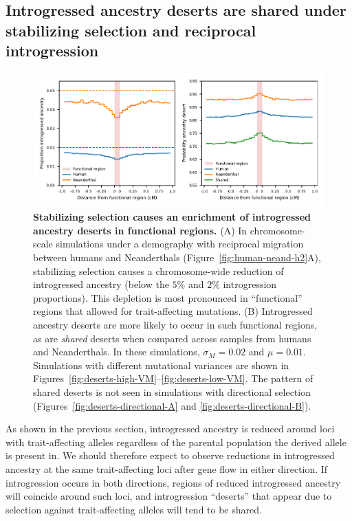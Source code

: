 \documentclass{article}
\begin{document}
\subsection*{Introgressed ancestry deserts are shared under stabilizing
selection and reciprocal introgression}

\begin{figure}[ht!]
    \centering
    \includegraphics{../figures/introgression_deserts.SD_0.02.pdf}
    \caption{
        \textbf{Stabilizing selection causes an enrichment of introgressed
        ancestry deserts in functional regions.} (A) In chromosome-scale
        simulations under a demography with reciprocal migration between humans
        and Neanderthals (Figure~\ref{fig:human-neand-h2}A), stabilizing
        selection causes a chromosome-wide reduction of introgressed ancestry
        (below the $5\%$ and $2\%$ introgression proportions). This depletion
        is most pronounced in ``functional'' regions that allowed for
        trait-affecting mutations. (B) Introgressed ancestry deserts are
        more likely to occur in such functional regions, as are
        \emph{shared} deserts when compared across samples from humans and
        Neanderthals. In these simulations, $\sigma_M=0.02$ and $\mu=0.01$.
        Simulations with different mutational variances are shown in
        Figures~\ref{fig:deserts-high-VM}--\ref{fig:deserts-low-VM}.
        The pattern of shared deserts is not seen in simulations with
        directional selection (Figures~\ref{fig:deserts-directional-A}
        and \ref{fig:deserts-directional-B}).
    }
    \label{fig:deserts}
\end{figure}

As shown in the previous section, introgressed ancestry is reduced around loci
with trait-affecting alleles regardless of the parental population the derived
allele is present in. We should therefore expect to observe reductions in
introgressed ancestry at the same trait-affecting loci after gene flow in
either direction. If introgression occurs in both directions, regions of
reduced introgressed ancestry will coincide around such loci, and introgression
``deserts'' that appear due to selection against trait-affecting alleles will
tend to be shared.
\end{document}
